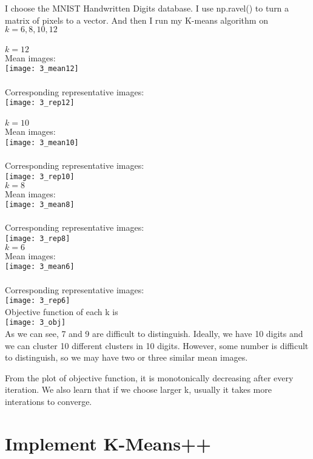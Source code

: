 \documentclass[10pt,letter]{article}
\numberwithin{equation}{section} %
\numberwithin{figure}{section} %
\numberwithin{table}{section} %
\begin{document}
I choose the MNIST Handwritten Digits database. I use np.ravel() to turn a matrix of pixels to a vector. And then I run my K-means algorithm on $k=6,8,10,12$\\
\\
$k=12$\\
Mean images:\\
\texttt{[image: 3\_mean12]}\\
\\
Corresponding representative images:\\
\texttt{[image: 3\_rep12]}\\
\\
\newpage
$k=10$\\
Mean images:\\
\texttt{[image: 3\_mean10]}\\
\\
Corresponding representative images:\\
\texttt{[image: 3\_rep10]}\\
\newpage
$k=8$\\
Mean images:\\
\texttt{[image: 3\_mean8]}\\
\\
Corresponding representative images:\\
\texttt{[image: 3\_rep8]}\\
\newpage
$k=6$\\
Mean images:\\
\texttt{[image: 3\_mean6]}\\
\\
Corresponding representative images:\\
\texttt{[image: 3\_rep6]}\\
\newpage
Objective function of each k is \\
\texttt{[image: 3\_obj]}\\
As we can see, 7 and 9 are difficult to distinguish. Ideally, we have 10 digits and we can cluster 10 different clusters in 10 digits. However, some number is difficult to distinguish, so we may have two or three similar mean images. 

From the plot of objective function, it is monotonically decreasing after every iteration. We also learn that if we choose larger k, usually it takes more interations to converge. 

	
\newpage
\section{Implement K-Means++}
\end{document}
